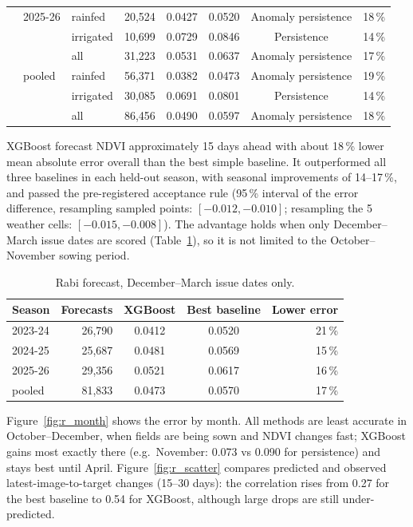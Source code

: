\documentclass[11pt,a4paper,oneside]{article}
\begin{document}
\begin{table}[H]
\begin{tabular}{@{}lllrcccr@{}}
 & 2025-26 & rainfed & 20,524 & 0.0427 & 0.0520 & Anomaly persistence & 18\,\% \\
 &  & irrigated & 10,699 & 0.0729 & 0.0846 & Persistence & 14\,\% \\
 &  & all & 31,223 & 0.0531 & 0.0637 & Anomaly persistence & 17\,\% \\
 & pooled & rainfed & 56,371 & 0.0382 & 0.0473 & Anomaly persistence & 19\,\% \\
 &  & irrigated & 30,085 & 0.0691 & 0.0801 & Persistence & 14\,\% \\
 &  & all & 86,456 & 0.0490 & 0.0597 & Anomaly persistence & 18\,\% \\
\bottomrule
\end{tabular}
\end{table}


XGBoost forecast NDVI approximately 15 days ahead with about 18\,\% lower mean absolute error overall than the best simple baseline. It outperformed all three baselines in each held-out season, with seasonal improvements of 14--17\,\%, and passed the pre-registered acceptance rule (95\,\% interval of the error difference, resampling sampled points: $[-0.012, -0.010]$; resampling the 5 weather cells: $[-0.015, -0.008]$). The advantage holds when only December--March issue dates are scored (Table~\ref{tab:r_decmar}), so it is not limited to the October--November sowing period.

\begin{table}[H]
\centering
\caption{Rabi forecast, December--March issue dates only.}
\label{tab:r_decmar}
\footnotesize
\begin{tabular}{@{}lrccr@{}}
\toprule
\textbf{Season} & \textbf{Forecasts} & \textbf{XGBoost} & \textbf{Best baseline} & \textbf{Lower error} \\
\midrule
2023-24 & 26,790 & 0.0412 & 0.0520 & 21\,\% \\
2024-25 & 25,687 & 0.0481 & 0.0569 & 15\,\% \\
2025-26 & 29,356 & 0.0521 & 0.0617 & 16\,\% \\
pooled & 81,833 & 0.0473 & 0.0570 & 17\,\% \\
\bottomrule
\end{tabular}
\end{table}


Figure~\ref{fig:r_month} shows the error by month. All methods are least accurate in October--December, when fields are being sown and NDVI changes fast; XGBoost gains most exactly there (e.g.\ November: 0.073 vs 0.090 for persistence) and stays best until April. Figure~\ref{fig:r_scatter} compares predicted and observed latest-image-to-target changes (15--30 days): the correlation rises from 0.27 for the best baseline to 0.54 for XGBoost, although large drops are still under-predicted.
\end{document}
